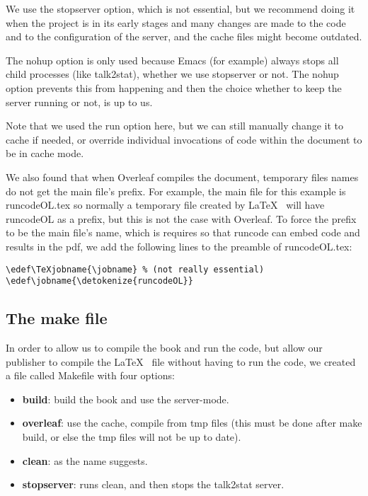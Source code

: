 \documentclass[12pt]{article}
\edef\TeXjobname{\jobname} %
\edef\jobname{\detokenize{runcodeOL}}
\begin{document}
We use the stopserver option, which is not essential, but we recommend doing it when the project is in its early stages and many changes are made to the code and to the configuration of the server, and the cache files might become outdated.

The nohup option is only used because Emacs (for example) always stops all child processes (like talk2stat), whether we use stopserver or not. The nohup option prevents this from happening and then the choice whether to keep the server running or not, is up to us.

Note that we used the run option here, but we can still manually change it to cache if needed, or override individual invocations of code within the document to be in cache mode.

\bigskip
We also  found that when Overleaf compiles the document, temporary files names do not get the main file's prefix. For example, the main file for this example is runcodeOL.tex so normally a temporary file created by \LaTeX~ will have runcodeOL as a prefix, but this is not the case with Overleaf. To force the prefix to be the main file's name, which is requires so that runcode can embed code and results in the pdf, we add the following lines to the preamble of runcodeOL.tex:
\begin{tcolorbox}
\begin{Verbatim}
\edef\TeXjobname{\jobname} % (not really essential)
\edef\jobname{\detokenize{runcodeOL}}
\end{Verbatim}
\end{tcolorbox}

\subsection*{The make file}

In order to allow us to compile the book and run the code, but allow our publisher to compile the \LaTeX~ file without having to run the code, we created a file called Makefile with four options:
\begin{itemize}
 \item \textbf{build}: build the book and use the server-mode.
 \item \textbf{overleaf}: use the cache, compile from tmp files (this must be done after make build, or else the tmp files will not be up to date).
 \item \textbf{clean}: as the name suggests.
 \item \textbf{stopserver}: runs clean, and then stops the talk2stat server.
\end{itemize}
\end{document}
